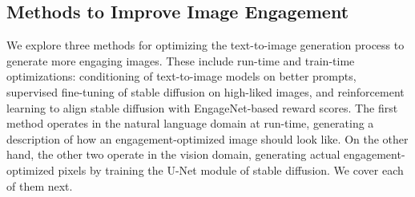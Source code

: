  

 
 
 
 
 
 
 
 

 \subsection{Methods to Improve Image Engagement}
 \label{sec:methods_to_improve_images}
 We explore three methods for optimizing the text-to-image generation process to generate more engaging images. These include run-time and train-time optimizations: conditioning of text-to-image models on better prompts, supervised fine-tuning of stable diffusion on high-liked images, and reinforcement learning to align stable diffusion with EngageNet-based reward scores. 
 The first method operates in the natural language domain at run-time, generating a description of how an engagement-optimized image should look like. On the other hand, the other two operate in the vision domain, generating actual engagement-optimized pixels by training the U-Net module of stable diffusion. We cover each of them next.
 
